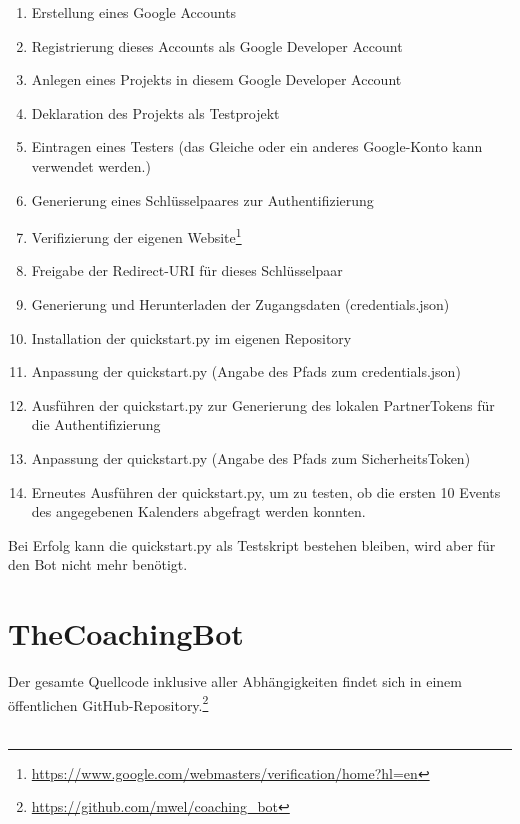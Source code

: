            \begin{enumerate}
                \item Erstellung eines Google Accounts
                \item Registrierung dieses Accounts als Google Developer Account
                \item Anlegen eines Projekts in diesem Google Developer Account
                \item Deklaration des Projekts als Testprojekt
                \item Eintragen eines Testers (das Gleiche oder ein anderes Google-Konto kann verwendet werden.)
                \item Generierung eines Schlüsselpaares zur Authentifizierung
                \item Verifizierung der eigenen Website\footnote{\url{https://www.google.com/webmasters/verification/home?hl=en}}
                \item Freigabe der Redirect-URI für dieses Schlüsselpaar
                \item Generierung und Herunterladen der Zugangsdaten (credentials.json)
                \item Installation der quickstart.py im eigenen Repository
                \item Anpassung der quickstart.py (Angabe des Pfads zum credentials.json)
                \item Ausführen der quickstart.py zur Generierung des lokalen Partner\-Tokens für die Authentifizierung
                \item Anpassung der quickstart.py (Angabe des Pfads zum Sicherheits\-Token)
                \item Erneutes Ausführen der quickstart.py, um zu testen, ob die ersten 10 Events des angegebenen Kalenders abgefragt werden konnten.                    
            \end{enumerate}
        
            Bei Erfolg kann die quickstart.py als Testskript bestehen bleiben, wird aber für den Bot nicht mehr benötigt.
        
    \section{TheCoachingBot}
        Der gesamte Quellcode inklusive aller Abhängigkeiten findet sich in einem öffentlichen GitHub-Repository.\footnote{\url{https://github.com/mwel/coaching_bot}}
        \\ \\
        
